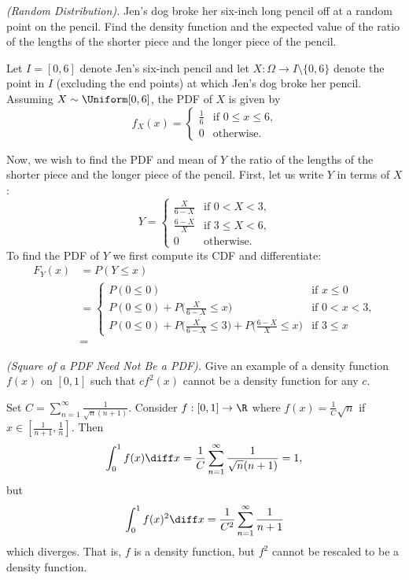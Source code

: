 \begin{problem}[Handout 12, \# 19]
  \emph{(Random Distribution).} Jen's dog broke her six-inch long pencil
  off at a random point on the pencil. Find the density function and the
  expected value of the ratio of the lengths of the shorter piece and the
  longer piece of the pencil.
\end{problem}
\begin{solution}
  Let \(I=[0,6]\) denote Jen's six-inch pencil and let
  \(X\colon\Omega\to I\setminus\{0,6\}\) denote the point in \(I\)
  (excluding the end points) at which Jen's dog broke her pencil. Assuming
  \(X\sim\Uniform[0,6]\), the PDF of \(X\) is given by
  \[
    f_X(x)=
    \begin{cases}
      \frac{1}{6}&\text{if \(0\leq x\leq 6\),}\\
      0&\text{otherwise.}
    \end{cases}
  \]

  Now, we wish to find the PDF and mean of \(Y\) the ratio of the lengths
  of the shorter piece and the longer piece of the pencil. First, let us
  write \(Y\) in terms of \(X\):
  \[
    Y=
    \begin{cases}
      \frac{X}{6-X}&\text{if \(0<X<3\),}\\
      \frac{6-X}{X}&\text{if \(3\leq X<6\),}\\
      0&\text{otherwise.}
    \end{cases}
  \]
  To find the PDF of \(Y\) we first compute its CDF and differentiate:
  \begin{align*}
    F_Y(x)
    &=P(Y\leq x)\\
    &=\begin{cases}
      P(0\leq 0)&\text{if \(x\leq 0\)}\\
      P(0\leq 0)+P\bigl(\frac{X}{6-X}\leq x\bigr)&\text{if \(0<x<3\),}\\
      P(0\leq 0)+P\bigl(\frac{X}{6-X}\leq 3\bigr)+
      P\bigl(\frac{6-X}{X}\leq x\bigr)&\text{if \(3\leq x\)}
    \end{cases}\\
    &=
  \end{align*}
\end{solution}
\newpage

\begin{problem}[Handout 12, \# 20]
  \emph{(Square of a PDF Need Not Be a PDF).} Give an example of a density
  function \(f(x)\) on \([0,1]\) such that \(cf^2(x)\) cannot be a density
  function for any \(c\).
\end{problem}
\begin{solution}
  Set $C = \sum_{n=1}^\infty \frac{1}{\sqrt{n}(n+1)}$. Consider
  $f: [0,1] \to \R$ where $f(x) = \frac{1}{C} \sqrt{n}$ if
  $x \in [\frac{1}{n+1},\frac{1}{n}]$. Then
  \[
    \int_0^1 f(x) \diff x = \frac{1}{C} \sum_{n=1}^\infty
    \frac{1}{\sqrt{n}(n+1)} =1,
  \]
  but
  \[
    \int_0^1 f(x)^2 \diff x = \frac{1}{C^2} \sum_{n=1}^\infty \frac{1}{n+1}
  \]
  which diverges. That is, $f$ is a density function, but $f^2$ cannot be
  rescaled to be a density function.
\end{solution}
\newpage

